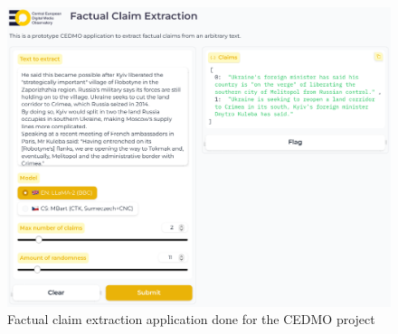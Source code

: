 %
%
\begin{figure}
    \includegraphics[width=16cm]{fig/cedmo.pdf}
    \caption{Factual claim extraction application done for the CEDMO project}
    \label{fig:claimgencedmo}
\end{figure}
%
